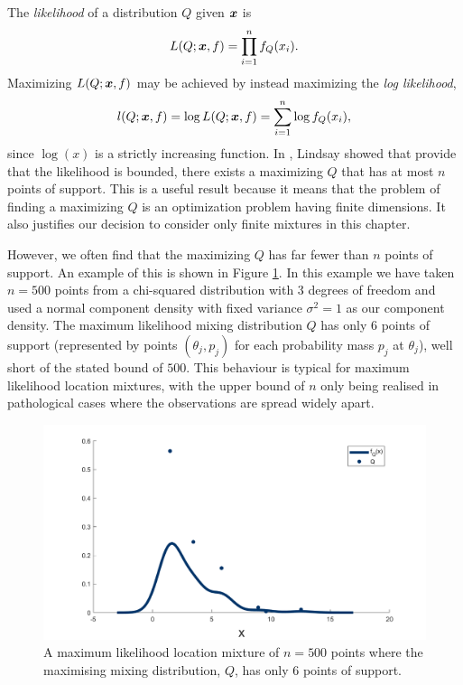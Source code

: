 	The \emph{likelihood} of a distribution $Q$ given ${\bm{{x}}}$ is 
	\begin{equation}
		L(Q;{\bm{{x}}}, f) = \prod_{i = 1}^n f_Q(x_i).
	\end{equation}
	Maximizing $L(Q;{\bm{{x}}}, f)$ may be achieved by instead maximizing the \emph{log likelihood},
	\begin{equation}
		l(Q; {\bm{{x}}}, f) = \log L(Q; {\bm{{x}}}, f) = \sum_{i = 1}^n \log f_Q(x_i),
		\label{eq:loglikelihood}
	\end{equation}
	since $\log(x)$ is a strictly increasing function. In \cite{Lindsay1983-tf}, Lindsay showed that provide that the likelihood is bounded, there exists a maximizing $Q$ that has at most $n$ points of support. This is a useful result because it means that the problem of finding a maximizing $Q$ is an optimization problem having finite dimensions. It also justifies our decision to consider only finite mixtures in this chapter.

	However, we often find that the maximizing $Q$ has far fewer than $n$ points of support. An example of this is shown in Figure \ref{fig:chi2 n500 motivation}. In this example we have taken $n = 500$ points from a chi-squared distribution with 3 degrees of freedom and used a normal component density with fixed variance $\sigma^2 = 1$ as our component density. The maximum likelihood mixing distribution $Q$ has only 6 points of support (represented by points $(\theta_j, p_j)$ for each probability mass $p_j$ at $\theta_j$), well short of the stated bound of $500$. This behaviour is typical for maximum likelihood location mixtures, with the upper bound of $n$ only being realised in pathological cases where the observations are spread widely apart.

	\begin{figure}
		\centering
		\includegraphics[width = \textwidth]{Figures/Mixtures/chi2_n500_motivation.png}
		\caption{A maximum likelihood location mixture of $n = 500$ points where the maximising mixing distribution, $Q$, has only 6 points of support.}
		\label{fig:chi2 n500 motivation}
	\end{figure}

